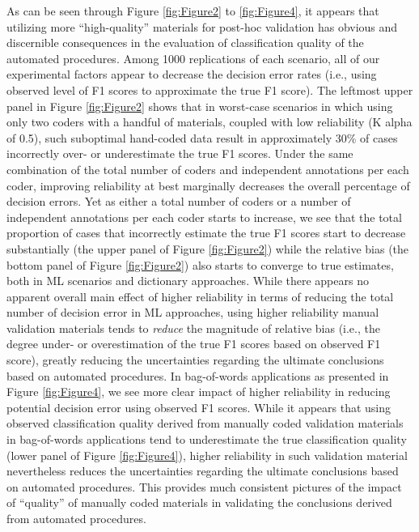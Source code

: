 \documentclass[man, 12pt, a4paper, nolmodern, noextraspace]{apa6}
\begin{document}
    As can be seen through Figure \ref{fig:Figure2} to \ref{fig:Figure4}, it appears that utilizing more \enquote{high-quality} materials for post-hoc validation has obvious and discernible consequences in the evaluation of classification quality of the automated procedures. Among 1000 replications of each scenario, all of our experimental factors appear to decrease the decision error rates (i.e., using observed level of F1 scores to approximate the true F1 score). The leftmost upper panel in Figure \ref{fig:Figure2} shows that in worst-case scenarios in which using only two coders with a handful of materials, coupled with low reliability (K alpha of 0.5), such suboptimal hand-coded data result in approximately 30\% of cases incorrectly over- or underestimate the true F1 scores. Under the same combination of the total number of coders and independent annotations per each coder, improving reliability at best marginally decreases the overall percentage of decision errors. Yet as either a total number of coders or a number of independent annotations per each coder starts to increase, we see that the total proportion of cases that incorrectly estimate the true F1 scores start to decrease substantially (the upper panel of Figure \ref{fig:Figure2}) while the relative bias (the bottom panel of Figure \ref{fig:Figure2}) also starts to converge to true estimates, both in ML scenarios and dictionary approaches. While there appears no apparent overall main effect of higher reliability in terms of reducing the total number of decision error in ML approaches, using higher reliability manual validation materials tends to \textit{reduce} the magnitude of relative bias (i.e., the degree under- or overestimation of the true F1 scores based on observed F1 score), greatly reducing the uncertainties regarding the ultimate conclusions based on automated procedures. In bag-of-words applications as presented in Figure \ref{fig:Figure4}, we see more clear impact of higher reliability in reducing potential decision error using observed F1 scores. While it appears that using observed classification quality derived from manually coded validation materials in bag-of-words applications tend to underestimate the true classification quality (lower panel of Figure \ref{fig:Figure4}), higher reliability in such validation material nevertheless reduces the uncertainties regarding the ultimate conclusions based on automated procedures. This provides much consistent pictures of the impact of \enquote{quality} of manually coded materials in validating the conclusions derived from automated procedures.   
\end{document}
